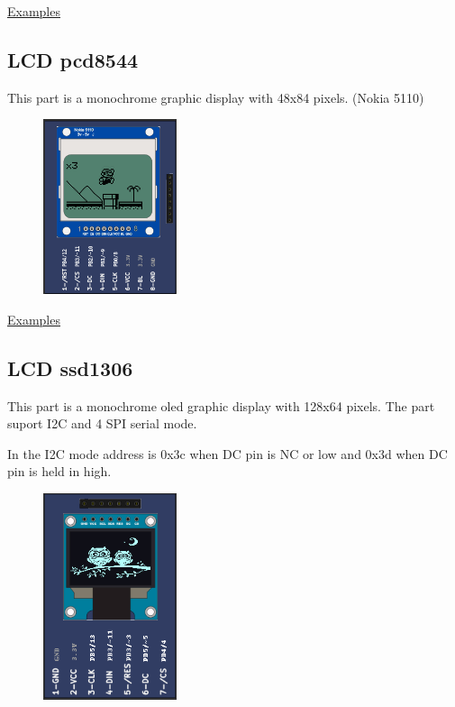 \href{https://lcgamboa.github.io/picsimlab_examples/parts_LCD_pcf8833.html}{Examples}


\subsection{LCD pcd8544 }

This part is a monochrome graphic display with 48x84 pixels. (Nokia 5110)

\begin{figure}[H]
\center
\includegraphics[width=0.35\textwidth]{img/part_pcd8544.png} 
\end{figure} 

\href{https://lcgamboa.github.io/picsimlab_examples/parts_LCD_pcd8544.html}{Examples}

\vspace{0.5cm}

\subsection{LCD ssd1306 }

This part is a monochrome oled graphic display with 128x64 pixels. 
The part suport I2C and 4 SPI serial mode.

In the I2C mode address is 0x3c when DC pin is NC or low and 0x3d when DC pin is held in high.

\begin{figure}[H]
\center
\includegraphics[width=0.35\textwidth]{img/part_lcd_ssd1306.png} 
\end{figure} 


